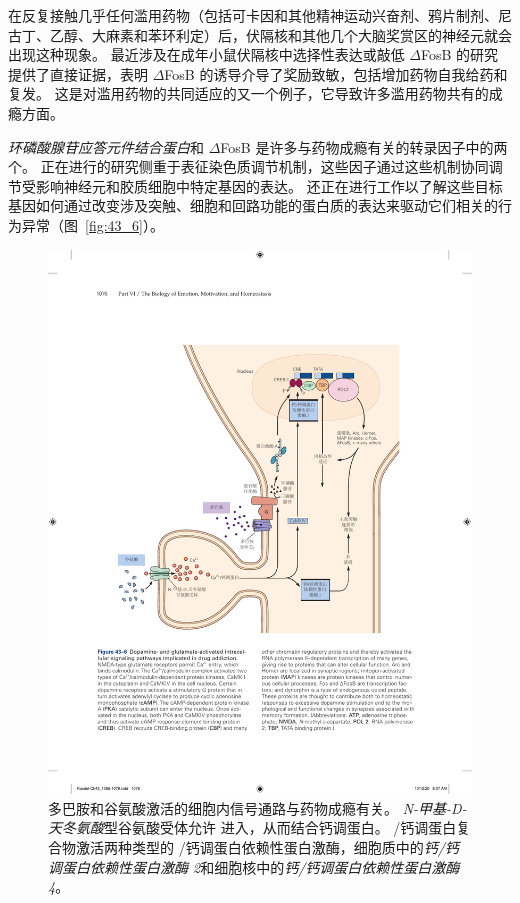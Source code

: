 在反复接触几乎任何滥用药物（包括可卡因和其他精神运动兴奋剂、鸦片制剂、尼古丁、乙醇、大麻素和苯环利定）后，伏隔核和其他几个大脑奖赏区的神经元就会出现这种现象。
最近涉及在成年小鼠伏隔核中选择性表达或敲低 $\Delta$FosB 的研究提供了直接证据，表明 $\Delta$FosB 的诱导介导了奖励致敏，包括增加药物自我给药和复发。
这是对滥用药物的共同适应的又一个例子，它导致许多滥用药物共有的成瘾方面。


\textit{环磷酸腺苷应答元件结合蛋白}和 $\Delta$FosB 是许多与药物成瘾有关的转录因子中的两个。
正在进行的研究侧重于表征染色质调节机制，这些因子通过这些机制协同调节受影响神经元和胶质细胞中特定基因的表达。
还正在进行工作以了解这些目标基因如何通过改变涉及突触、细胞和回路功能的蛋白质的表达来驱动它们相关的行为异常（图~\ref{fig:43_6}）。


\begin{figure}[htbp]
	\centering
	\includegraphics[width=0.9\linewidth]{chap43/fig_43_6}
	\caption{多巴胺和谷氨酸激活的细胞内信号通路与药物成瘾有关。
		\textit{N-甲基-D-天冬氨酸}型谷氨酸受体允许  进入，从而结合钙调蛋白。
		/钙调蛋白复合物激活两种类型的 /钙调蛋白依赖性蛋白激酶，细胞质中的\textit{钙/钙调蛋白依赖性蛋白激酶 2}和细胞核中的\textit{钙/钙调蛋白依赖性蛋白激酶 4}。
}
\end{figure}
